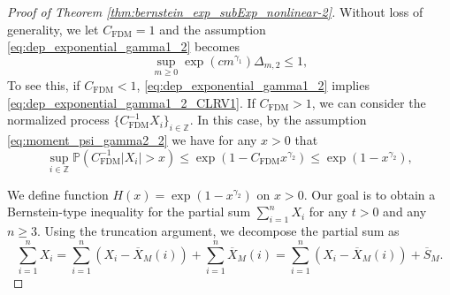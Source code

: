 \documentclass[11pt]{article}
\theoremstyle{plain}
\theoremstyle{definition}
\begin{document}
\begin{proof}[Proof of Theorem \ref{thm:bernstein_exp_subExp_nonlinear-2}]
Without loss of generality, we let $C_{\mathrm{FDM}} = 1$ and the assumption \eqref{eq:dep_exponential_gamma1_2} becomes 
\begin{equation}\label{eq:dep_exponential_gamma1_2_CLRV1}
    \sup_{m \geq 0}\exp(cm^{\gamma_1})\Delta_{m,2} \leq 1,
\end{equation}
To see this, if $C_{\mathrm{FDM}} < 1$, \eqref{eq:dep_exponential_gamma1_2} implies \eqref{eq:dep_exponential_gamma1_2_CLRV1}.
If $C_{\mathrm{FDM}} > 1$, we can consider the normalized process $\{C_{\mathrm{FDM}}^{-1}X_i\}_{i \in \mathbb{Z}}$. In this case, by the assumption \eqref{eq:moment_psi_gamma2_2} we have for any $x > 0$ that \begin{equation*}
    \sup_{i \in \mathbb{Z}}\mathbb{P}(C_{\mathrm{FDM}}^{-1}|X_i| > x) \leq \exp(1 - C_{\mathrm{FDM}}x^{\gamma_2}) \leq \exp(1 - x^{\gamma_2}),
\end{equation*}

We define function $H(x) = \exp(1 - x^{\gamma_2})$ on $x > 0$.
Our goal is to obtain a Bernstein-type inequality for the partial sum $\sum_{i = 1}^nX_i$ for any $t > 0$ and any $n \geq 3$.
Using the truncation argument, we decompose the partial sum as
\begin{equation}\label{eq:decompose_partial_sum}
    \sum_{i = 1}^nX_i = \sum_{i = 1}^n(X_i - \overline{X}_M(i)) + \sum_{i = 1}^n\overline{X}_M(i) = \sum_{i = 1}^n(X_i - \overline{X}_M(i)) + \overline{S}_M.
\end{equation}


\end{proof}
\end{document}
